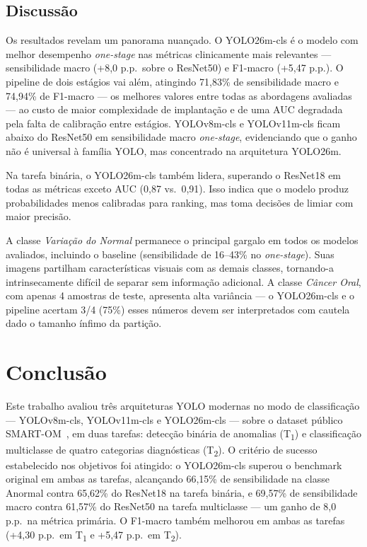 \documentclass[12pt]{article}
\begin{document}
\FloatBarrier
\subsection{Discussão}

Os resultados revelam um panorama nuançado. O YOLO26m-cls é o modelo com
melhor desempenho \textit{one-stage} nas métricas clinicamente mais
relevantes — sensibilidade macro (+8,0 p.p.\ sobre o ResNet50) e
F1-macro (+5,47 p.p.).
O pipeline de dois estágios vai além, atingindo 71,83\% de sensibilidade
macro e 74,94\% de F1-macro — os melhores valores entre todas as
abordagens avaliadas — ao custo de maior complexidade de implantação e
de uma AUC degradada pela falta de calibração entre estágios.
YOLOv8m-cls e YOLOv11m-cls ficam abaixo do ResNet50 em sensibilidade
macro \textit{one-stage}, evidenciando que o ganho não é universal à
família YOLO, mas concentrado na arquitetura YOLO26m.

Na tarefa binária, o YOLO26m-cls também lidera, superando o ResNet18
em todas as métricas exceto AUC (0,87 vs.\ 0,91). Isso indica que o
modelo produz probabilidades menos calibradas para ranking, mas toma
decisões de limiar com maior precisão.

A classe \textit{Variação do Normal} permanece o principal gargalo em
todos os modelos avaliados, incluindo o baseline (sensibilidade de
16--43\% no \textit{one-stage}). Suas imagens partilham características
visuais com as demais classes, tornando-a intrinsecamente difícil de
separar sem informação adicional. A classe \textit{Câncer Oral}, com
apenas 4 amostras de teste, apresenta alta variância — o YOLO26m-cls e
o pipeline acertam 3/4 (75\%) esses números devem ser interpretados com
cautela dado o tamanho ínfimo da partição.


\section{Conclusão}
\label{sec:conclusao}

Este trabalho avaliou três arquiteturas YOLO modernas no modo de
classificação — YOLOv8m-cls, YOLOv11m-cls e YOLO26m-cls — sobre o
dataset público SMART-OM~\cite{smartom}, em duas tarefas: detecção
binária de anomalias (T\textsubscript{1}) e classificação multiclasse
de quatro categorias diagnósticas (T\textsubscript{2}).
O critério de sucesso estabelecido nos objetivos foi atingido: o
YOLO26m-cls superou o benchmark original em ambas as tarefas,
alcançando 66,15\% de sensibilidade na classe Anormal contra 65,62\%
do ResNet18 na tarefa binária, e 69,57\% de sensibilidade macro contra
61,57\% do ResNet50 na tarefa multiclasse — um ganho de 8,0 p.p.\ na
métrica primária.
O F1-macro também melhorou em ambas as tarefas (+4,30 p.p.\ em
T\textsubscript{1} e +5,47 p.p.\ em T\textsubscript{2}).
\end{document}
